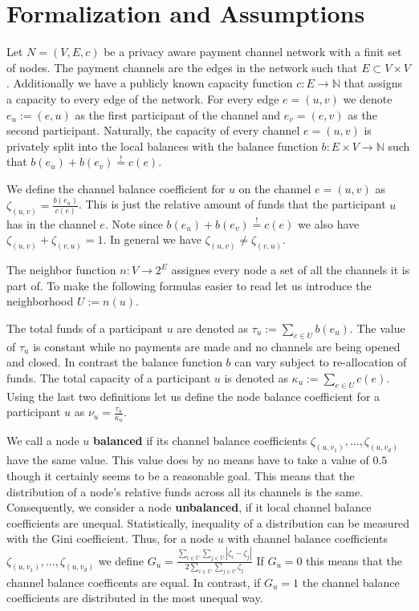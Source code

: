 \documentclass[a4paper]{paper}
\begin{document}
\section{Formalization and Assumptions}
\label{sec:formalization}

Let $N=(V,E,c)$ be a privacy aware payment channel network with a finit set of nodes.
The payment channels are the edges in the network such that $E\subset V\times V$.
Additionally we have a publicly known capacity function $c: E\longrightarrow \mathbb{N}$ that assigns a capacity to every edge of the network.
For every edge $e=(u,v)$ we denote $e_u:=(e,u)$ as the first participant of the channel and $e_v=(e,v)$ as the second participant.
Naturally, the capacity of every channel $e=(u,v)$ is privately split into the local balances with the balance function $b: E\times V\longrightarrow\mathbb{N}$ such that $b(e_u)+b(e_v)\stackrel{!}{=}c(e)$.

We define the channel balance coefficient for $u$ on the channel $e=(u,v)$ as  $\zeta_{(u,v)} = \frac{b(e_u)}{c(e)}$.
This is just the relative amount of funds that the participant $u$ has in the channel $e$.
Note since $b(e_u)+b(e_v)\stackrel{!}{=}c(e)$ we also have $\zeta_{(u,v)} + \zeta_{(v,u)}=1$.
In general we have $\zeta_{(u,v)} \neq \zeta_{(v,u)}$.

The neighbor function $n : V \longrightarrow 2^{E}$ assignes every node a set of all the channels it is part of.
To make the following formulas easier to read let us introduce the neighborhood $U:=n(u)$.

The total funds of a participant $u$ are denoted as $\tau_u:=\displaystyle{\sum_{e\in U}b(e_u)}$.
The value of $\tau_u$ is constant while no payments are made and no channels are being opened and closed.
In contrast the balance function $b$ can vary subject to re-allocation of funds.
The total capacity of a participant $u$ is denoted as $\kappa_u:=\displaystyle{\sum_{e\in U}c(e)}$.
Using the last two definitions let us define the node balance coefficient for a participant $u$ as $\nu_u = \frac{\tau_u}{\kappa_u}$.

We call a node $u$ {\bf balanced} if its channel balance coefficients $\zeta_{(u,v_1)},\dots,\zeta_{(u,v_d)}$ have the same value.
This value does by no means have to take a value of $0.5$ though it certainly seems to be a reasonable goal.
This means that the distribution of a node's relative funds across all its channels is the same.
Consequently, we consider a node {\bf unbalanced}, if it local channel balance coefficients are unequal.
Statistically, inequality of a distribution can be measured with the Gini coefficient.
Thus, for a node $u$ with channel balance coefficients $\zeta_{(u,v_1)},\dots,\zeta_{(u,v_d)}$ we define $G_u = \frac{\displaystyle{\sum_{i\in U} \sum_{j \in U}} | \zeta_i - \zeta_j |}{2 \displaystyle{\sum_{i \in U} \sum_{j \in U} \zeta_j}}$
If $G_u = 0$ this means that the channel balance coefficents are equal.
In contrast, if $G_u = 1$ the channel balance coefficients are distributed in the most unequal way.
\end{document}
